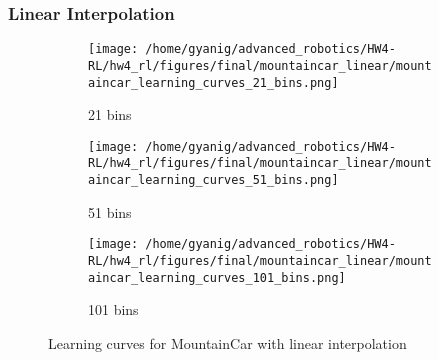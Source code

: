 \documentclass{article}
\begin{document}
\subsubsection{Linear Interpolation}
\begin{figure}[H]
    \centering
    \begin{subfigure}{0.32\textwidth}
        \texttt{[image: /home/gyanig/advanced\_robotics/HW4-RL/hw4\_rl/figures/final/mountaincar\_linear/mountaincar\_learning\_curves\_21\_bins.png]}
        \caption{21 bins}
    \end{subfigure}
    \begin{subfigure}{0.32\textwidth}
        \texttt{[image: /home/gyanig/advanced\_robotics/HW4-RL/hw4\_rl/figures/final/mountaincar\_linear/mountaincar\_learning\_curves\_51\_bins.png]}
        \caption{51 bins}
    \end{subfigure}
    \begin{subfigure}{0.32\textwidth}
        \texttt{[image: /home/gyanig/advanced\_robotics/HW4-RL/hw4\_rl/figures/final/mountaincar\_linear/mountaincar\_learning\_curves\_101\_bins.png]}
        \caption{101 bins}
    \end{subfigure}
    \caption{Learning curves for MountainCar with linear interpolation}
\end{figure}
\end{document}
